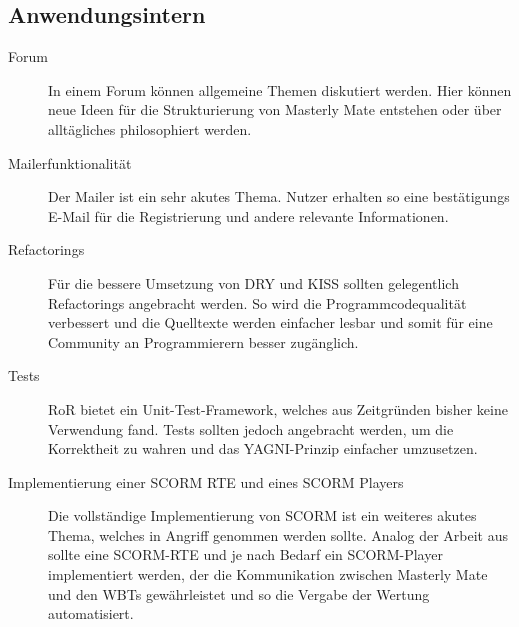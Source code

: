 \subsection{Anwendungsintern}
\begin{description}
\item[Forum] In einem Forum können allgemeine Themen diskutiert werden. Hier
können neue Ideen für die Strukturierung von Masterly Mate entstehen oder über
alltägliches philosophiert werden.
\item[Mailerfunktionalität] Der Mailer ist ein sehr akutes Thema. Nutzer
erhalten so eine bestätigungs E-Mail für die Registrierung und andere relevante
Informationen.
\item[Refactorings] Für die bessere Umsetzung von DRY und KISS sollten
gelegentlich Refactorings angebracht werden. So wird die Programmcodequalität
verbessert und die Quelltexte werden einfacher lesbar und somit für eine
Community an Programmierern besser zugänglich.
\item[Tests] RoR bietet ein Unit-Test-Framework, welches aus Zeitgründen bisher
keine Verwendung fand. Tests sollten jedoch angebracht werden, um die
Korrektheit zu wahren und das YAGNI-Prinzip einfacher umzusetzen.
\item[Implementierung einer SCORM RTE und eines SCORM Players] Die vollständige
Implementierung von SCORM ist ein weiteres akutes Thema, welches in Angriff
genommen werden sollte. Analog der Arbeit aus \cite{mitter:2005} sollte eine
SCORM-RTE und je nach Bedarf ein SCORM-Player implementiert werden, der die
Kommunikation zwischen Masterly Mate und den WBTs gewährleistet und so die
Vergabe der Wertung automatisiert.
\end{description}

